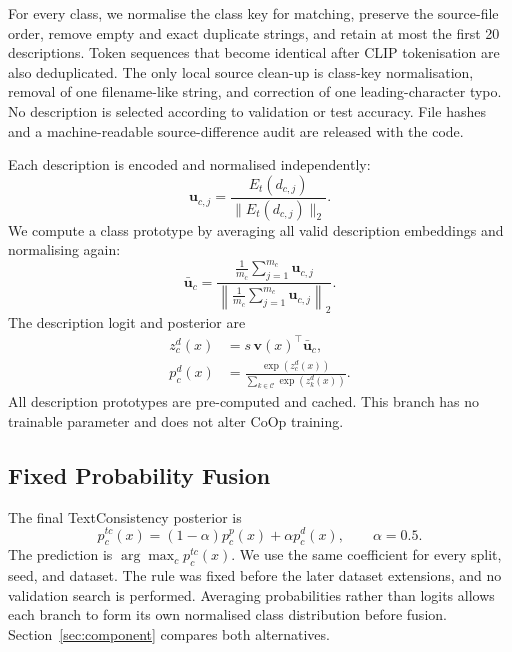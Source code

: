\documentclass[preprint,12pt]{elsarticle}
\begin{document}
For every class, we normalise the class key for matching, preserve the source-file order, remove empty and exact duplicate strings, and retain at most the first 20 descriptions. Token sequences that become identical after CLIP tokenisation are also deduplicated. The only local source clean-up is class-key normalisation, removal of one filename-like string, and correction of one leading-character typo. No description is selected according to validation or test accuracy. File hashes and a machine-readable source-difference audit are released with the code.

Each description is encoded and normalised independently:
\begin{equation}
\mathbf{u}_{c,j}=\frac{E_t(d_{c,j})}{\|E_t(d_{c,j})\|_2}.
\end{equation}
We compute a class prototype by averaging all valid description embeddings and normalising again:
\begin{equation}
\bar{\mathbf{u}}_c=
\frac{\frac{1}{m_c}\sum_{j=1}^{m_c}\mathbf{u}_{c,j}}
{\left\|\frac{1}{m_c}\sum_{j=1}^{m_c}\mathbf{u}_{c,j}\right\|_2}.
\label{eq:desc_proto}
\end{equation}
The description logit and posterior are
\begin{align}
z^{d}_{c}(x) &= s\,\mathbf{v}(x)^{\top}\bar{\mathbf{u}}_c,\\
p^{d}_{c}(x) &= \frac{\exp(z^{d}_{c}(x))}{\sum_{k\in\mathcal{C}}\exp(z^{d}_{k}(x))}.
\end{align}
All description prototypes are pre-computed and cached. This branch has no trainable parameter and does not alter CoOp training.

\subsection{Fixed Probability Fusion}

The final TextConsistency posterior is
\begin{equation}
p^{tc}_{c}(x)=(1-\alpha)p^{p}_{c}(x)+\alpha p^{d}_{c}(x),
\qquad \alpha=0.5.
\label{eq:fusion}
\end{equation}
The prediction is $\arg\max_c p^{tc}_{c}(x)$. We use the same coefficient for every split, seed, and dataset. The rule was fixed before the later dataset extensions, and no validation search is performed. Averaging probabilities rather than logits allows each branch to form its own normalised class distribution before fusion. Section~\ref{sec:component} compares both alternatives.
\end{document}
